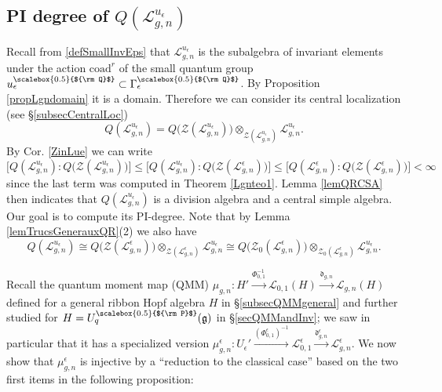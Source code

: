 \documentclass[11pt]{amsart}
\newcommand{\e}{\epsilon}
\newcommand{\Ll}{\mathcal{L}}
\newcommand{\Q}{{\scalebox{0.5}{${\rm Q}$}}}
\newcommand{\Pup}{{\scalebox{0.5}{${\rm P}$}}}
\begin{document}
\subsection{PI degree of \texorpdfstring{$Q( \mathcal{L}_{g,n}^{u_\e} )$}{the central localization}}\label{subsecPIdegInv}
Recall from \eqref{defSmallInvEps} that $\mathcal{L}_{g,n}^{u_\e}$ is the subalgebra of invariant elements under the action $\mathrm{coad}^r$ of the small quantum group $u_\e^\Q \subset \Gamma_\e^\Q$. By Proposition \ref{propLgndomain} it is a domain. Therefore we can consider its central localization (see \S\ref{subsecCentralLoc})
\[ Q( \mathcal{L}_{g,n}^{u_\e} ) = Q\bigl(\mathcal{Z}(\Ll_{g,n}^{u_\e})\bigr) \otimes_{\mathcal{Z}(\Ll_{g,n}^{u_\e})} \Ll_{g,n}^{u_\e}. \]
By Cor. \ref{ZinLue} we can write 
\[ \bigl[ Q( \mathcal{L}_{g,n}^{u_\e} ) : Q\bigl(\mathcal{Z}(\Ll_{g,n}^{u_\e})\bigr) \bigr] \leq \bigl[ Q( \mathcal{L}_{g,n}^{u_\e} ) : Q\bigl(\mathcal{Z}(\Ll^\e_{g,n})\bigr) \bigr] \leq \bigl[ Q( \mathcal{L}_{g,n}^\e) : Q\bigl(\mathcal{Z}(\Ll_{g,n}^\e)\bigr) \bigr] < \infty \]
since the last term was computed in Theorem \ref{Lgnteo1}. Lemma \ref{lemQRCSA} then indicates that $Q(\mathcal{L}_{g,n}^{u_\e})$ is a division algebra and a central simple algebra. Our goal is to compute its PI-degree. Note that by Lemma \ref{lemTrucsGenerauxQR}(2) we also have
\[ Q(\mathcal{L}_{g,n}^{u_\e}) \cong Q\bigl( \mathcal{Z}(\mathcal{L}_{g,n}^\e) \bigr) \otimes_{\mathcal{Z}(\mathcal{L}_{g,n}^\e)} \mathcal{L}_{g,n}^{u_\e} \cong Q\bigl( \mathcal{Z}_0(\mathcal{L}_{g,n}^\e) \bigr) \otimes_{\mathcal{Z}_0(\mathcal{L}_{g,n}^\e)} \mathcal{L}_{g,n}^{u_\e}. \]

\indent Recall the quantum moment map (QMM) $\mu_{g,n} : H' \xrightarrow{\Phi_{0,1}^{-1}} \mathcal{L}_{0,1}(H) \xrightarrow{\mathfrak{d}_{g,n}} \mathcal{L}_{g,n}(H)$ defined for a general ribbon Hopf algebra $H$ in \S\ref{subsecQMMgeneral} and further studied for $H = U_q^\Pup(\mathfrak{g})$ in \S\ref{secQMMandInv}; we saw in particular that it has a specialized version $\mu_{g,n}^\e : U_\e'\xrightarrow{(\Phi_{0,1}^\e)^{-1}} \mathcal{L}_{0,1}^{\e} \xrightarrow{\mathfrak{d}_{g,n}^{\e}} \mathcal{L}_{g,n}^{\e}$. We now show that $\mu_{g,n}^\e$ is injective by a ``reduction to the classical case'' based on the two first items in the following proposition:
\end{document}

